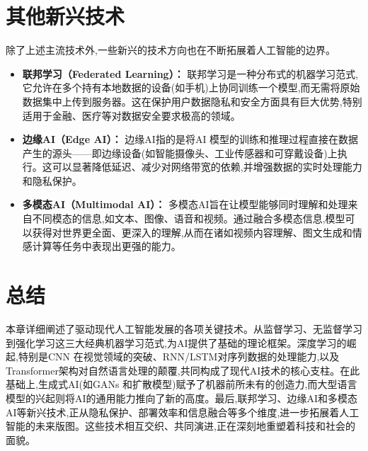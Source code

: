 \section{其他新兴技术}
\label{sec:emerging_tech}
除了上述主流技术外,一些新兴的技术方向也在不断拓展着人工智能的边界。
\begin{itemize}
    \item \textbf{联邦学习（Federated Learning）：} 联邦学习是一种分布式的机器学习范式,它允许在多个持有本地数据的设备(如手机)上协同训练一个模型,而无需将原始数据集中上传到服务器。这在保护用户数据隐私和安全方面具有巨大优势,特别适用于金融、医疗等对数据安全要求极高的领域。
    \item \textbf{边缘AI（Edge AI）：} 边缘AI指的是将AI 模型的训练和推理过程直接在数据产生的源头——即边缘设备(如智能摄像头、工业传感器和可穿戴设备)上执行。这可以显著降低延迟、减少对网络带宽的依赖,并增强数据的实时处理能力和隐私保护。
    \item \textbf{多模态AI（Multimodal AI）：} 多模态AI旨在让模型能够同时理解和处理来自不同模态的信息,如文本、图像、语音和视频。通过融合多模态信息,模型可以获得对世界更全面、更深入的理解,从而在诸如视频内容理解、图文生成和情感计算等任务中表现出更强的能力。
\end{itemize}

\section{总结}
\label{sec:conclusion_chap2}
本章详细阐述了驱动现代人工智能发展的各项关键技术。从监督学习、无监督学习到强化学习这三大经典机器学习范式,为AI提供了基础的理论框架。深度学习的崛起,特别是CNN 在视觉领域的突破、RNN/LSTM对序列数据的处理能力,以及Transformer架构对自然语言处理的颠覆,共同构成了现代AI技术的核心支柱。在此基础上,生成式AI(如GANs 和扩散模型)赋予了机器前所未有的创造力,而大型语言模型的兴起则将AI的通用能力推向了新的高度。最后,联邦学习、边缘AI和多模态 AI等新兴技术,正从隐私保护、部署效率和信息融合等多个维度,进一步拓展着人工智能的未来版图。这些技术相互交织、共同演进,正在深刻地重塑着科技和社会的面貌。